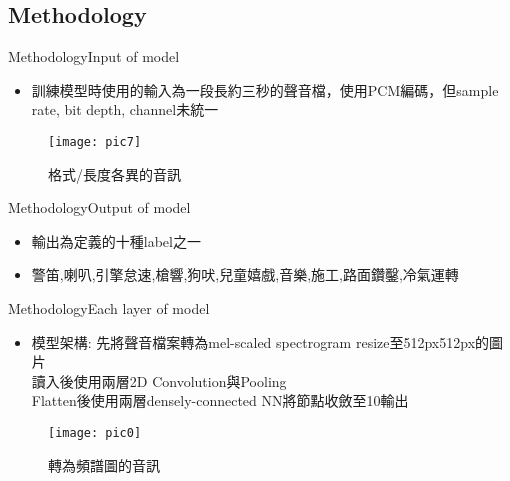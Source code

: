 \documentclass{beamer}
\begin{document}
\begin{CJK}{UTF8}{bsmi}
\section{Methodology}
\begin{frame}{Methodology}{Input of model }
  \begin{itemize}
  \item {
   訓練模型時使用的輸入為一段長約三秒的聲音檔，使用PCM編碼，但sample rate, bit depth, channel未統一
  }
  \end{itemize}
\begin{figure}[H] %
\texttt{[image: pic7]} %
\caption{格式/長度各異的音訊} %
\end{figure}
\end{frame}
\begin{frame}{Methodology}{Output of model }
  \begin{itemize}
  \item {
   輸出為定義的十種label之一
  }
\item{警笛,喇叭,引擎怠速,槍響,狗吠,兒童嬉戲,音樂,施工,路面鑽鑿,冷氣運轉}
  \end{itemize}




\end{frame}
\begin{frame}{Methodology}{Each layer of model }
  \begin{itemize}
  \item {
    模型架構: 先將聲音檔案轉為mel-scaled spectrogram resize至512px512px的圖片\\讀入後使用兩層2D Convolution與Pooling\\Flatten後使用兩層densely-connected NN將節點收斂至10輸出
  }
  \end{itemize}
\begin{figure}[H] %
\texttt{[image: pic0]} %
\caption{轉為頻譜圖的音訊} %
\end{figure}
\end{frame}


\end{CJK}
\end{document}
